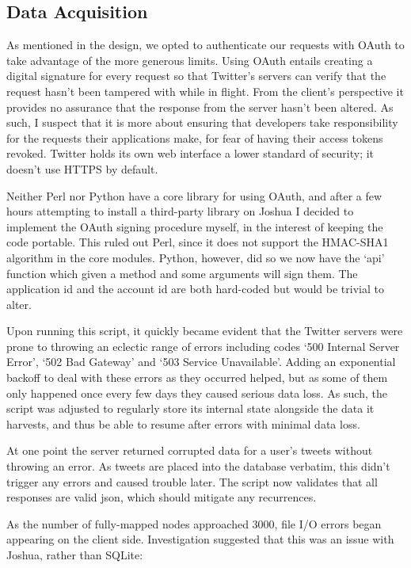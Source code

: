 \subsection{Data Acquisition}

As mentioned in the design, we opted to authenticate our requests with OAuth to take advantage of the more generous limits. Using OAuth entails creating a digital signature for every request so that Twitter's servers can verify that the request hasn't been tampered with while in flight. From the client's perspective it provides no assurance that the response from the server hasn't been altered. As such, I suspect that it is more about ensuring that developers take responsibility for the requests their applications make, for fear of having their access tokens revoked. Twitter holds its own web interface a lower standard of security; it doesn't use HTTPS by default.

Neither Perl nor Python have a core library for using OAuth, and after a few hours attempting to install a third-party library on Joshua I decided to implement the OAuth signing procedure myself, in the interest of keeping the code portable. This ruled out Perl, since it does not support the HMAC-SHA1 algorithm in the core modules. Python, however, did so we now have the `api' function which given a method and some arguments will sign them. The application id and the account id are both hard-coded but would be trivial to alter.

Upon running this script, it quickly became evident that the Twitter servers were prone to throwing an eclectic range of errors including codes `500 Internal Server Error', `502 Bad Gateway' and ‘503 Service Unavailable'. Adding an exponential backoff to deal with these errors as they occurred helped, but as some of them only happened once every few days they caused serious data loss. As such, the script was adjusted to regularly store its internal state alongside the data it harvests, and thus be able to resume after errors with minimal data loss.

At one point the server returned corrupted data for a user's tweets without throwing an error. As tweets are placed into the database verbatim, this didn't trigger any errors and caused trouble later. The script now validates that all responses are valid json, which should mitigate any recurrences.

As the number of fully-mapped nodes approached 3000, file I/O errors began appearing on the client side. Investigation suggested that this was an issue with Joshua, rather than SQLite:

